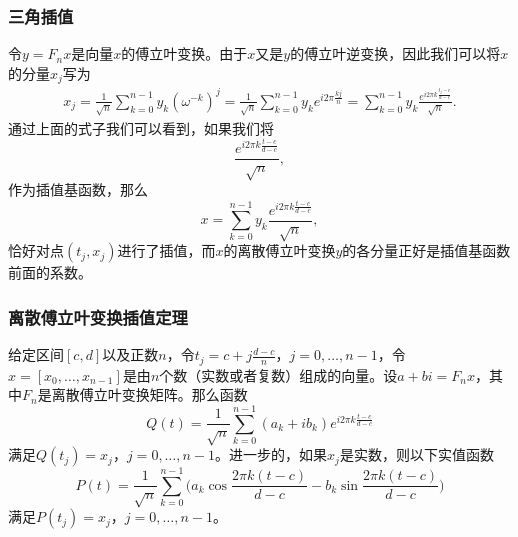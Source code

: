 \documentclass[10pt]{beamer}
\begin{document}
\begin{frame}
\frametitle{三角插值}
令$y = F_n x$是向量$x$的傅立叶变换。由于$x$又是$y$的傅立叶逆变换，因此我们可以将$x$的分量$x_j$写为
\begin{align}
x_j = \frac{1}{\sqrt{n}} \sum_{k = 0}^{n-1} y_k (\omega^{-k})^j 
     = \frac{1}{\sqrt{n}} \sum_{k = 0}^{n-1} y_k e^{i 2\pi\frac{kj}{n}} 
     = \sum_{k = 0}^{n-1} y_k \frac{e^{i 2\pi k \frac{t_j - c}{d-c}}}{\sqrt{n}}.
\end{align}
通过上面的式子我们可以看到，如果我们将
\begin{equation}
 \frac{e^{i 2\pi k \frac{t - c}{d-c}}}{\sqrt{n}},
\end{equation}
作为插值基函数，那么
\begin{equation}
x = \sum_{k = 0}^{n-1} y_k \frac{e^{i 2\pi k \frac{t - c}{d-c}}}{\sqrt{n}},
\end{equation}
恰好对点$(t_j, x_j)$进行了插值，而$x$的离散傅立叶变换$y$的各分量正好是插值基函数前面的系数。
\end{frame}


\begin{frame}
\frametitle{离散傅立叶变换插值定理}
\begin{theorem}[离散傅立叶变换插值定理]
\label{thm: DFT interp 1}
给定区间$[c,d]$以及正数$n$，令$t_j = c + j\frac{d-c}{n}$，$j = 0, \ldots, n-1$，令$x = [x_0, \ldots, x_{n-1}]$是由$n$个数（实数或者复数）组成的向量。设$a + b i = F_n x$，其中$F_n$是离散傅立叶变换矩阵。那么函数
\begin{equation}
Q(t) = \frac{1}{\sqrt{n}} \sum_{k = 0}^{n-1} (a_k + i b_k) e^{i 2\pi k \frac{t - c}{d-c}}
\end{equation}
满足$Q(t_j) = x_j$，$j = 0, \ldots, n-1$。进一步的，如果$x_j$是实数，则以下实值函数
\begin{equation}
P(t) = \frac{1}{\sqrt{n}} \sum_{k=0}^{n-1} \big(a_k \cos \frac{2 \pi k (t-c)}{d-c} - b_k \sin \frac{2 \pi k (t-c)}{d-c}  \big)
\end{equation}
满足$P(t_j) = x_j$，$j = 0, \ldots, n-1$。
\end{theorem}
\end{frame}
\end{document}
